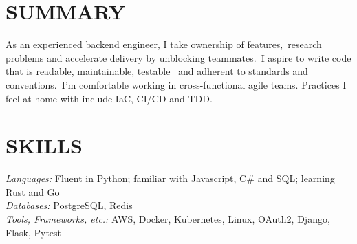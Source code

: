 \documentclass[line,margin]{res}
\begin{document}
\address{\href{mailto://simon.r.crowe@protonmail.com}{simon.r.crowe@protonmail.com}}

 
\begin{resume}
 
\section{SUMMARY} As an experienced backend engineer, I take ownership of features,\
                  research problems and accelerate delivery by unblocking teammates.\
                  I aspire to write code that is readable, maintainable, testable \
                  and adherent to standards and conventions.\
                  I'm comfortable working in cross-functional agile teams.
                  Practices I feel at home with include IaC, CI/CD and TDD. 

 
\section{SKILLS} {\sl Languages:} Fluent in Python;
                familiar with Javascript, C\# and SQL; learning Rust and Go \\
                {\sl Databases:} PostgreSQL, Redis \\
                {\sl Tools, Frameworks, etc.:} AWS, Docker, Kubernetes, Linux, OAuth2, Django, Flask, Pytest

 

\end{resume}
\end{document}
